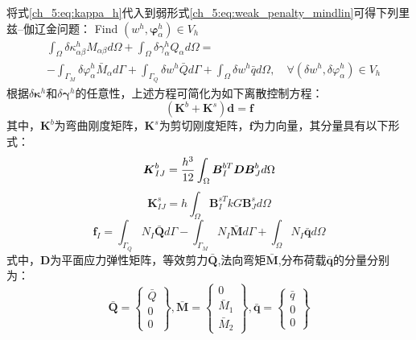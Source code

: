 将式\eqref{ch_5:eq:kappa_h}代入到弱形式\eqref{ch_5:eq:weak_penalty_mindlin}可得下列里兹--伽辽金问题：
Find $(w^h,\boldsymbol{\varphi}^h_{\alpha})\in V_h$
\begin{equation}\label{ch_5:eq:ritz_penalty_mindlin}
    \begin{split} 
        &\int_{\Omega}\delta\kappa^h_{\alpha\beta}M_{\alpha\beta}d\Omega+\int_{\Omega}\delta\gamma^h_{\alpha}Q_{\alpha}d\Omega=\\
        &-\int_{\Gamma_{M}}\delta\varphi^h_{\alpha}{\bar{M}_{\alpha}}d\Gamma+\int_{\Gamma_{Q}}{\delta{w^h}}\bar {Q}d\Gamma+\int_{\Omega} \delta{w^h}\bar{q}d\Omega,\quad \forall(\delta w^h,\delta\varphi^h_{\alpha}) \in V_h
    \end{split}
\end{equation}
根据$\delta\boldsymbol\kappa^h$和$\delta\boldsymbol\gamma^h$的任意性，上述方程可简化为如下离散控制方程：
\begin{equation}\label{ch_5:eq:equilibrium_penalty}
    (\boldsymbol K^b + \boldsymbol K^s) \boldsymbol d = \boldsymbol f
\end{equation}
其中，$\boldsymbol K^b$为弯曲刚度矩阵，$\boldsymbol K^s$为剪切刚度矩阵，$\pmb{f}$为力向量，其分量具有以下形式：
\begin{equation}\label{ch_5:eq:stiffness_bending}
    \boldsymbol K^b_{IJ} = \frac{h^3}{12} \int_\Omega \boldsymbol B^{bT}_I \boldsymbol D \boldsymbol B^b_J d\Omega\\
\end{equation}
\begin{equation}\label{ch_5:eq:stiffness_shear}
    \boldsymbol K^s_{IJ} = h \int_\Omega \boldsymbol B^{sT}_I kG \boldsymbol B^s_J d\Omega
\end{equation}
\begin{equation}
    \boldsymbol f_I = \int_{\Gamma_Q} N_I \bar{\boldsymbol Q} d\Gamma - \int_{\Gamma_M} N_I \bar{\boldsymbol M} d\Gamma + \int_\Omega N_I \bar{\boldsymbol q} d\Omega
\end{equation}
式中，$\boldsymbol{D}$为平面应力弹性矩阵，等效剪力$\bar{\boldsymbol Q}$,法向弯矩$\bar{\boldsymbol M}$,分布荷载$\bar{\boldsymbol q}$的分量分别为：
\begin{equation}
    \bar{\boldsymbol Q} =  
    \begin{Bmatrix}
        \bar Q \\ 0 \\ 0
    \end{Bmatrix},
        \bar{\boldsymbol M} =
    \begin{Bmatrix}
        0 \\ \bar M_1 \\ \bar M_2
    \end{Bmatrix},
        \bar{\boldsymbol q} =
    \begin{Bmatrix}
        \bar q \\ 0 \\ 0
    \end{Bmatrix}
\end{equation}


